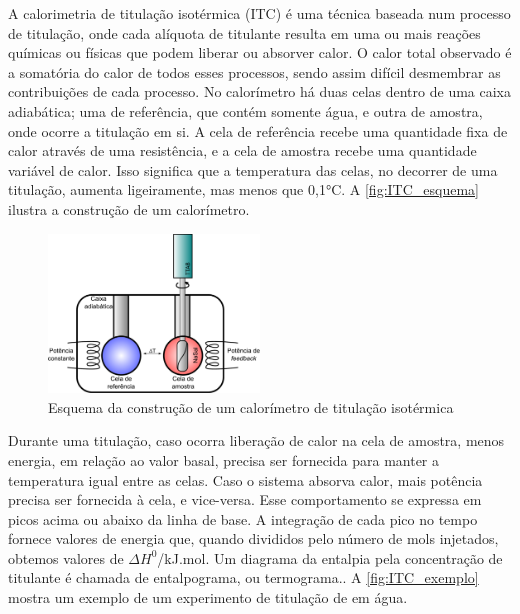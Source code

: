 		A calorimetria de titulação isotérmica (ITC) é uma técnica baseada num processo de titulação, onde cada alíquota de titulante resulta em uma ou mais reações químicas ou físicas que podem liberar ou absorver calor. O calor total observado é a somatória do calor de todos esses processos, sendo assim difícil desmembrar as contribuições de cada processo.\cite{Loh2016} No calorímetro há duas celas dentro de uma caixa adiabática; uma de referência, que contém somente água, e outra de amostra, onde ocorre a titulação em si.\cite{Bouchemal2010a} A cela de referência recebe uma quantidade fixa de calor através de uma resistência, e a cela de amostra recebe uma quantidade variável de calor. Isso significa que a temperatura das celas, no decorrer de uma titulação, aumenta ligeiramente, mas menos que 0,1°C. A \autoref{fig:ITC_esquema} ilustra a construção de um calorímetro.
		
		\begin{figure}[h]
			\centering
			\includegraphics[width=0.5\textwidth]{./imagens/itc/esquema_itc_equipamento}
			\caption{Esquema da construção de um calorímetro de titulação isotérmica}
			\label{fig:ITC_esquema}
		\end{figure} 
		
		Durante uma titulação, caso ocorra liberação de calor na cela de amostra, menos energia, em relação ao valor basal, precisa ser fornecida para manter a temperatura igual entre as celas. Caso o sistema absorva calor, mais potência precisa ser fornecida à cela, e vice-versa. Esse comportamento se expressa em picos acima ou abaixo da linha de base. A integração de cada pico no tempo fornece valores de energia que, quando divididos pelo número de mols injetados, obtemos valores de \(\Delta H^0\)/kJ.mol\menosUm. Um diagrama da entalpia pela concentração de titulante é chamada de entalpograma, ou termograma.\cite{Bouchemal2010a}. A \autoref{fig:ITC_exemplo} mostra um exemplo de um experimento de titulação de \TTAB{} em água.
		
